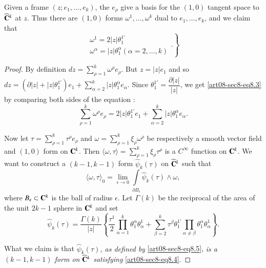 Given a frame $(z;e_{1},\ldots,e_{k})$, the $e_{\rho}$ give a basis for the $(1,0)$ tangent space to $\widehat{\mathbf{C}}^{k}$ at $z$. Thus there are $(1,0)$ forms $\omega^{1},\ldots,\omega^{k}$ dual to $e_{1},\ldots,e_{k}$, and we claim that
\begin{equation}
\left.
\begin{array}{l}
\omega^{1}=2|z|\theta^{1'}_{1}\\
\omega^{\alpha}=|z|\theta^{\alpha}_{1}(\alpha=2,\ldots,k)
\end{array}.\label{art08-sec8-eq8.3}
\right\}
\end{equation}

\begin{proof}
By definition $dz=\sum\limits^{k}_{\rho=1}\omega^{\rho}e_{\rho}$. But $z=|z|e_{1}$ and so $dz=(\partial |z|+|z|\theta^{1'}_{1})e_{1}+\sum\limits^{k}_{\alpha=2}|z|\theta^{\alpha}_{1}e_{\alpha}$. Since $\theta^{1'}_{1}=\dfrac{\partial|z|}{|z|}$, we get \eqref{art08-sec8-eq8.3} by comparing both sides of the equation :
$$
\sum\limits^{k}_{\rho=1}\omega^{\rho}e_{\rho}=2|z|\theta^{1'}_{1}e_{1}+\sum\limits^{k}_{\alpha=2}|z|\theta^{\alpha}_{1}e_{\alpha}.
$$

Now let $\tau=\sum\limits^{k}_{\rho=1}\tau^{\rho}e_{\rho}$ and $\omega=\sum\limits^{k}_{\rho=1}\xi_{\rho}\omega^{\rho}$ be respectively a smooth vector field and $(1,0)$ form on $\mathbf{C}^{k}$. Then $\langle \omega,\tau\rangle=\sum\limits^{k}_{\rho=1}\xi_{\rho}\tau^{\rho}$ is a $C^{\infty}$ function on $\mathbf{C}^{k}$. We want to construct a $(k-1,k-1)$ form $\widehat{\psi}_{k}(\tau)$ on $\widehat{\mathbf{C}}^{k}$ such that
\begin{equation}
\langle \omega,\tau\rangle_{0}=\lim\limits_{\epsilon\to 0}\int\limits_{\partial B_{\epsilon}}\widehat{\psi}_{k}(\tau)\wedge \omega,\label{art08-sec8-eq8.4}
\end{equation}
where $B_{\epsilon}\subset \mathbf{C}^{k}$ is the ball of radius $\epsilon$. Let $\Gamma(k)$ be the reciprocal of the area of the unit $2k-1$ sphere in $\mathbf{C}^{k}$ and set 
\begin{equation}
\widehat{\psi}_{k}(\tau)=\dfrac{\Gamma(k)}{|z|}\left\{\dfrac{\tau^{1}}{2}\prod\limits^{k}_{\alpha=1}\theta^{\alpha}_{1}\theta^{1}_{\alpha}+\sum\limits^{k}_{\beta=2}\tau^{\beta}\theta^{1'}_{1}\prod\limits_{\alpha\neq \beta}\theta^{\alpha}_{1}\theta^{1}_{\alpha}\right\}.\label{art08-sec8-eq8.5}
\end{equation}

What we claim is that {\em $\widehat{\psi}_{k}(\tau)$, as defined by} \eqref{art08-sec8-eq8.5}, {\em is a $(k-1,k-1)$ form on $\widehat{\mathbf{C}}^{k}$ satisfying} \eqref{art08-sec8-eq8.4}. 
\end{proof}

